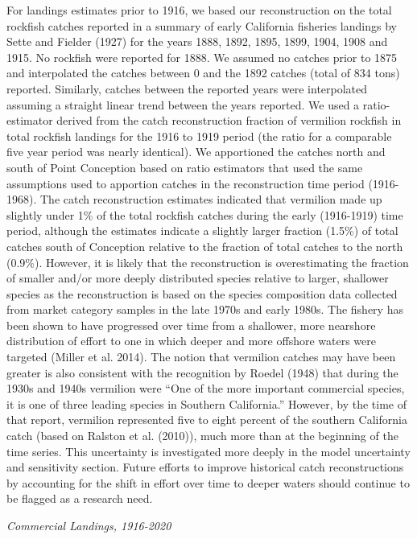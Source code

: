 \documentclass[
  english,
  a4paper,
]{article}
\begin{document}
For landings estimates prior to 1916, we based our reconstruction on the total
rockfish catches reported in a summary of early California fisheries landings by
Sette and Fielder (1927) for the years 1888, 1892, 1895, 1899, 1904, 1908
and 1915. No rockfish were reported for 1888. We assumed no catches prior to 1875
and interpolated the catches between 0 and the 1892 catches (total of 834
tons) reported. Similarly, catches between the reported years were interpolated
assuming a straight linear trend between the years reported. We used a
ratio-estimator derived from the catch reconstruction fraction of vermilion
rockfish in total rockfish landings for the 1916 to 1919 period (the ratio for
a comparable five year period was nearly identical). We apportioned the catches
north and south of Point Conception based on ratio estimators that used the same
assumptions used to apportion catches in the reconstruction time period (1916-1968).
The catch reconstruction estimates indicated that vermilion made up slightly under
1\% of the total rockfish catches during the early (1916-1919) time period, although
the estimates indicate a slightly larger fraction (1.5\%) of total catches south of
Conception relative to the fraction of total catches to the north (0.9\%). However,
it is likely that the reconstruction is overestimating the fraction of smaller and/or
more deeply distributed species relative to larger, shallower species as the
reconstruction is based on the species composition data collected from market
category samples in the late 1970s and early 1980s. The fishery has been shown
to have progressed over time from a shallower, more nearshore distribution of
effort to one in which deeper and more offshore waters were targeted (Miller et al. 2014).
The notion that vermilion catches may have been greater is also consistent with
the recognition by Roedel (1948) that during the 1930s and 1940s vermilion
were ``One of the more important commercial species, it is one of three leading
species in Southern California.'' However, by the time of that report, vermilion
represented five to eight percent of the southern California catch (based on
Ralston et al. (2010)), much more than at the beginning of the time
series. This uncertainty is investigated more deeply in the model uncertainty and sensitivity section. Future efforts to improve historical catch reconstructions by accounting
for the shift in effort over time to deeper waters should continue to be flagged
as a research need.

\emph{Commercial Landings, 1916-2020}
\end{document}
